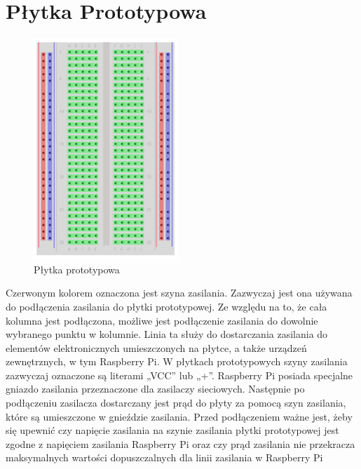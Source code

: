 \section{Płytka Prototypowa}
\begin{figure}[htbp]
	\centering
	\includegraphics[width=0.7\linewidth]{"obrazy/Breadboard"}
	\caption{Płytka prototypowa}
	\label{fig:3}
\end{figure}
Czerwonym kolorem oznaczona jest szyna zasilania. Zazwyczaj jest ona używana do podłączenia zasilania do płytki prototypowej. Ze względu na to, że cała kolumna jest podłączona, możliwe jest podłączenie zasilania do dowolnie wybranego punktu w kolumnie. Linia ta służy do dostarczania zasilania do elementów elektronicznych umieszczonych na płytce, a także urządzeń zewnętrznych, w tym Raspberry Pi. W płytkach prototypowych szyny zasilania zazwyczaj oznaczone są literami „VCC” lub „+”. Raspberry Pi posiada specjalne gniazdo zasilania przeznaczone dla zasilaczy sieciowych. Następnie po podłączeniu zasilacza dostarczany jest prąd do płyty za pomocą szyn zasilania, które są umieszczone w gnieździe zasilania. Przed podłączeniem ważne jest, żeby się upewnić czy napięcie zasilania na szynie zasilania płytki prototypowej jest zgodne z napięciem zasilania Raspberry Pi oraz czy prąd zasilania nie przekracza maksymalnych wartości dopuszczalnych dla linii zasilania w Raspberry Pi
